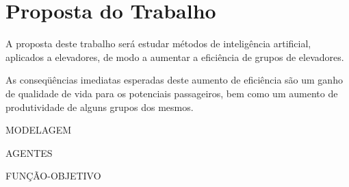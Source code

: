 \chapter{\label{chap:proposal}Proposta do Trabalho}

A proposta deste trabalho será estudar métodos de inteligência artificial,
aplicados a elevadores, de modo a aumentar a eficiência de grupos de elevadores.

As conseqüências imediatas esperadas deste aumento de eficiência são um ganho de
qualidade de vida para os potenciais passageiros, bem como um aumento de
produtividade de alguns grupos dos mesmos.

MODELAGEM

AGENTES

FUNÇÃO-OBJETIVO